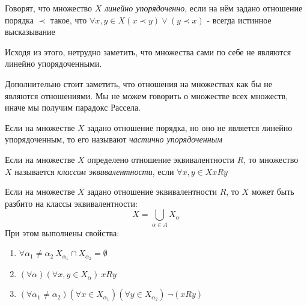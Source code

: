 \begin{definition}
    Говорят, что множество $X$ \textit{линейно упорядоченно}, если на нём задано отношение порядка $\prec$ такое, что $\forall x, y \in X (x \prec y) \vee (y \prec x)$ - всегда истинное высказывание
\end{definition}

Исходя из этого, нетрудно заметить, что множества сами по себе не являются линейно упорядоченными.

\begin{anote}
    Дополнительно стоит заметить, что отношения на множествах как бы не являются отношениями. Мы не можем говорить о множестве всех множеств, иначе мы получим парадокс Рассела.
\end{anote}

\begin{definition}
    Если на множестве $X$ задано отношение порядка, но оно не является линейно упорядоченным, то его называют \textit{частично упорядоченным}
\end{definition}

\begin{definition}
    Если на множестве $X$ определено отношение эквивалентности $R$, то множество $X$ называется \textit{классом эквивалентности}, если $\forall x, y \in X xRy$
\end{definition}

\begin{theorem}
    Если на множестве $X$ задано отношение эквивалентности $R$, то $X$ может быть разбито на классы эквивалентности:
    $$
        X = \bigcup\limits_{\alpha \in A} X_{\alpha}
    $$
    При этом выполнены свойства:
    \begin{enumerate}
        \item $\forall \alpha_1 \neq \alpha_2\ X_{\alpha_1} \cap X_{\alpha_2} = \emptyset$
        \item $(\forall \alpha)(\forall x, y \in X_{\alpha})\ xRy$
        \item $(\forall \alpha_1 \neq \alpha_2)(\forall x \in X_{\alpha_1})(\forall y \in X_{\alpha_2})\ \neg (xRy)$
    \end{enumerate}
\end{theorem}